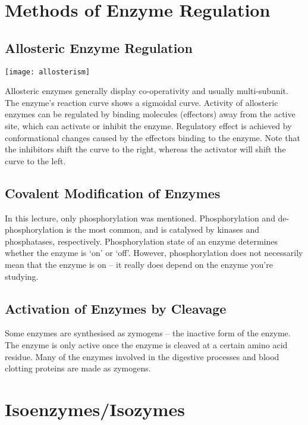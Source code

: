 \documentclass[a4paper, 12pt]{report}
\begin{document}
\section{Methods of Enzyme Regulation}

\subsection{Allosteric Enzyme Regulation}

\begin{center}
\texttt{[image: allosterism]}
\end{center}

Allosteric enzymes generally display co-operativity and usually multi-subunit.
The enzyme's reaction curve shows a sigmoidal curve.
Activity of allosteric enzymes can be regulated by binding molecules (effectors) away from the active site, which can activate or inhibit the enzyme.
Regulatory effect is achieved by conformational changes caused by the effectors binding to the enzyme.
Note that the inhibitors shift the curve to the right, whereas the activator will shift the curve to the left.

\subsection{Covalent Modification of Enzymes}

In this lecture, only phosphorylation was mentioned.
Phosphorylation and de-phosphorylation is the most common, and is catalysed by kinases and phosphatases, respectively.
Phosphorylation state of an enzyme determines whether the enzyme is `on' or `off'.
However, phosphorylation does not necessarily mean that the enzyme is on -- it really does depend on the enzyme you're studying.

\subsection{Activation of Enzymes by Cleavage}

Some enzymes are synthesised as zymogens -- the inactive form of the enzyme.
The enzyme is only active once the enzyme is cleaved at a certain amino acid residue.
Many of the enzymes involved in the digestive processes and blood clotting proteins are made as zymogens.

\section{Isoenzymes/Isozymes}
\end{document}
